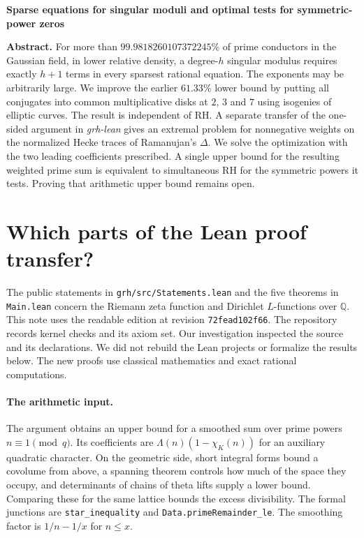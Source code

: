 \documentclass[11pt]{article}
\begin{document}
\thispagestyle{plain}
\par\vspace{10pt}
{\LARGE\bfseries\color{ink}Sparse equations for singular moduli and optimal tests for symmetric-power zeros\par}\vspace{9pt}
\noindent\textbf{Abstract.}
For more than $99.9818260107372245\%$ of prime conductors in the Gaussian field, in lower relative density, a degree-$h$ singular modulus requires exactly $h+1$ terms in every sparsest rational equation. The exponents may be arbitrarily large. We improve the earlier $61.33\%$ lower bound by putting all conjugates into common multiplicative disks at $2$, $3$ and $7$ using isogenies of elliptic curves. The result is independent of RH. A separate transfer of the one-sided argument in \emph{grh-lean} gives an extremal problem for nonnegative weights on the normalized Hecke traces of Ramanujan's $\Delta$. We solve the optimization with the two leading coefficients prescribed. A single upper bound for the resulting weighted prime sum is equivalent to simultaneous RH for the symmetric powers it tests. Proving that arithmetic upper bound remains open.

\section{Which parts of the Lean proof transfer?}
The public statements in \texttt{grh/src/Statements.lean} and the five theorems in \texttt{Main.lean} concern the Riemann zeta function and Dirichlet $L$-functions over $\mathbb Q$. This note uses the readable edition at revision \texttt{72fead102f66}. The repository records kernel checks and its axiom set. Our investigation inspected the source and its declarations. We did not rebuild the Lean projects or formalize the results below. The new proofs use classical mathematics and exact rational computations.\cite{source}

\paragraph{The arithmetic input.}
The argument obtains an upper bound for a smoothed sum over prime powers $n\equiv1\pmod q$. Its coefficients are $\Lambda(n)(1-\chi_K(n))$ for an auxiliary quadratic character. On the geometric side, short integral forms bound a covolume from above, a spanning theorem controls how much of the space they occupy, and determinants of chains of theta lifts supply a lower bound. Comparing these for the same lattice bounds the excess divisibility. The formal junctions are \texttt{star\_inequality} and \texttt{Data.primeRemainder\_le}. The smoothing factor is $1/n-1/x$ for $n\le x$.\cite{source}
\end{document}
